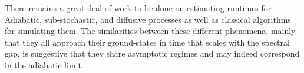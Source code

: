 \documentclass[letterpaper,12pt]{umd-thesis}
\numberwithin{equation}{chapter}
\numberwithin{thm}{chapter}
\numberwithin{lem}{chapter}
\numberwithin{cor}{chapter}
\numberwithin{definition}{chapter}
\begin{document}
There remains a great deal of work to be done on estimating runtimes for Adiabatic, sub-stochastic, and diffusive processes as well as classical algorithms for simulating them. The similarities between these different phenomena, mainly that they all approach their ground-states in time that scales with the spectral gap, is suggestive that they share asymptotic regimes and may indeed correspond in the adiabatic limit. 






\end{document}
